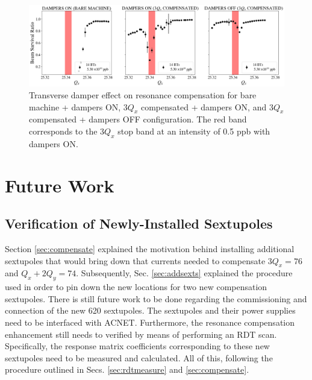 \begin{figure}[H]
    \centering
    \includegraphics[width=\columnwidth]{chapter7/dampers_config.png}
    \caption{Transverse damper effect on resonance compensation for bare machine + dampers ON, $3Q_x$ compensated + dampers ON, and $3Q_x$ compensated + dampers OFF configuration. The red band corresponds to the $3Q_x$ stop band at an intensity of 0.5 ppb with dampers ON.}
    \label{fig:dampers7}
\end{figure}

\section{Future Work}

\subsection{Verification of Newly-Installed Sextupoles}

Section \ref{sec:compensate} explained the motivation behind installing additional sextupoles that would bring down that currents needed to compensate $3Q_x=76$ and $Q_x+ 2Q_y = 74$. Subsequently, Sec. \ref{sec:addsexts} explained the procedure used in order to pin down the new locations for two new compensation sextupoles. There is still future work to be done regarding the commissioning and connection of the new 620 sextupoles. The sextupoles and their power supplies need to be interfaced with ACNET. Furthermore, the resonance compensation enhancement still needs to verified by means of performing an RDT scan. Specifically, the response matrix coefficients corresponding to these new sextupoles need to be measured and calculated. All of this, following the procedure outlined in Secs. \ref{sec:rdtmeasure} and \ref{sec:compensate}.

